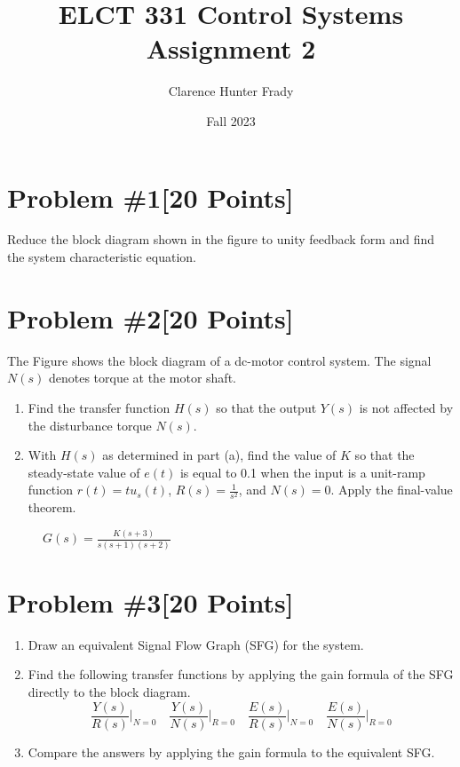 \documentclass{article}
\title{ELCT 331 Control Systems Assignment 2}
\author{Clarence Hunter Frady}
\date{Fall 2023}
\begin{document}
\maketitle

\section*{Problem \#1[20 Points]}
Reduce the block diagram shown in the figure to unity feedback form and find the system characteristic equation. 
\newline
\begin{figure}[htbp]
  \centering
  
\end{figure}

\newpage
\section*{Problem \#2[20 Points]}
The Figure shows the block diagram of a dc-motor control system. The signal \( N(s) \) denotes torque at the motor shaft.

\begin{enumerate}
    \item[a. ] Find the transfer function \( H(s) \) so that the output \( Y(s) \) is not affected by the disturbance torque \( N(s) \).
    \item[b. ] With \( H(s) \) as determined in part (a), find the value of \( K \) so that the steady-state value of \( e(t) \) is equal to 0.1 when the input is a unit-ramp function \( r(t)=tu_s(t) \), \( R(s)=\frac{1}{s^2} \), and \( N(s)=0 \). Apply the final-value theorem.
\end{enumerate}
\newline
\begin{figure}[htbp]
  \centering
  
  \Large \( G(s) = \frac{K(s + 3)}{s(s + 1)(s + 2)} \)
\end{figure}


\newpage
\section*{Problem \#3[20 Points]}
\begin{enumerate}
    \item[a. ] Draw an equivalent Signal Flow Graph (SFG) for the system.
    \item[b. ] Find the following transfer functions by applying the gain formula of the SFG directly to the block diagram.
    \[
    \frac{Y(s)}{R(s)} \bigg|_{N=0} \quad \frac{Y(s)}{N(s)} \bigg|_{R=0} \quad \frac{E(s)}{R(s)} \bigg|_{N=0} \quad \frac{E(s)}{N(s)} \bigg|_{R=0}
    \]
    \item[c. ] Compare the answers by applying the gain formula to the equivalent SFG.
\end{enumerate}
\newline
\begin{figure}[htbp]
  \centering
  
\end{figure}
\end{document}
